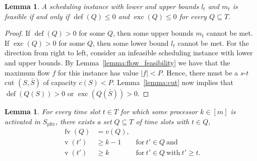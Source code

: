 \documentclass[a4paper]{article}
\DeclareMathOperator{\pltr}{pltr}
\DeclareMathOperator{\fv}{fv}
\DeclareMathOperator{\vol}{v}
\DeclareMathOperator{\opdef}{def}
\DeclareMathOperator{\exc}{exc}
\newtheorem{lemma}[theorem]{Lemma}
\begin{document}
\begin{lemma}\label{lemma:feasibility}
  A scheduling instance with lower and upper bounds $l_t$ and $m_t$ is feasible if and only if $\opdef(Q) \leq 0$ and $\exc(Q) \leq 0$ for every $Q \subseteq T$.
\end{lemma}
\begin{proof}
  If $\opdef(Q) > 0$ for some $Q$, then some upper bounds $m_t$ cannot be met.
  If $\exc(Q) > 0$ for some $Q$, then some lower bound $l_t$ cannot be met.
  For the direction from right to left, consider an infeasible scheduling instance with lower and upper bounds.
  By Lemma~\ref{lemma:flow_feasibility} we have that the maximum flow $f$ for this instance has value $|f| < P$.
  Hence, there must be a $s$-$t$ cut $(S, \bar S)$ of capacity $c(S) < P$.
  Lemma~\ref{lemma:cut} now implies that $\opdef(Q(S)) > 0$ or $\exc(Q(\bar S)) > 0$.
\end{proof}
\begin{lemma}\label{lemma:critical}
  For every time slot $t \in T$ for which some processor $k \in [m]$ is activated in $S_{\pltr}$, there exists a set $Q \subseteq T$ of time slots with $t \in Q, $
  \begin{align}
    \fv(Q) &= v(Q) \text{,}\\
    \vol(t') &\geq k-1 &~\text{for}~t' \in Q~\text{and}\\
    \vol(t') &\geq k &~\text{for}~t' \in Q~\text{with}~t' \geq t \text{.}
  \end{align}
\end{lemma}
\end{document}
